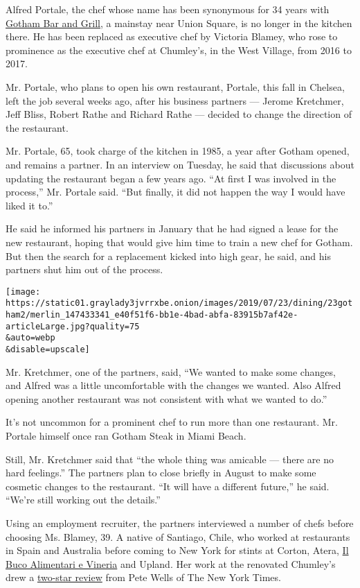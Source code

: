 Alfred Portale, the chef whose name has been synonymous for 34 years
with \href{https://www.gothambarandgrill.com/}{Gotham Bar and Grill}, a
mainstay near Union Square, is no longer in the kitchen there. He has
been replaced as executive chef by Victoria Blamey, who rose to
prominence as the executive chef at Chumley's, in the West Village, from
2016 to 2017.

Mr. Portale, who plans to open his own restaurant, Portale, this fall in
Chelsea, left the job several weeks ago, after his business partners ---
Jerome Kretchmer, Jeff Bliss, Robert Rathe and Richard Rathe --- decided
to change the direction of the restaurant.

Mr. Portale, 65, took charge of the kitchen in 1985, a year after Gotham
opened, and remains a partner. In an interview on Tuesday, he said that
discussions about updating the restaurant began a few years ago. ``At
first I was involved in the process,'' Mr. Portale said. ``But finally,
it did not happen the way I would have liked it to.''

He said he informed his partners in January that he had signed a lease
for the new restaurant, hoping that would give him time to train a new
chef for Gotham. But then the search for a replacement kicked into high
gear, he said, and his partners shut him out of the process.

\texttt{[image: https://static01.graylady3jvrrxbe.onion/images/2019/07/23/dining/23gotham2/merlin\_147433341\_e40f51f6-bb1e-4bad-abfa-83915b7af42e-articleLarge.jpg?quality=75\\\&auto=webp\\\&disable=upscale]}

Mr. Kretchmer, one of the partners, said, ``We wanted to make some
changes, and Alfred was a little uncomfortable with the changes we
wanted. Also Alfred opening another restaurant was not consistent with
what we wanted to do.''

It's not uncommon for a prominent chef to run more than one restaurant.
Mr. Portale himself once ran Gotham Steak in Miami Beach.

Still, Mr. Kretchmer said that ``the whole thing was amicable --- there
are no hard feelings.'' The partners plan to close briefly in August to
make some cosmetic changes to the restaurant. ``It will have a different
future,'' he said. ``We're still working out the details.''

Using an employment recruiter, the partners interviewed a number of
chefs before choosing Ms. Blamey, 39. A native of Santiago, Chile, who
worked at restaurants in Spain and Australia before coming to New York
for stints at Corton, Atera,
\href{https://www.nytimes3xbfgragh.onion/2012/02/15/dining/reviews/il-buco-alimentari-e-vineria-nyc-restaurant-review.html}{Il
Buco Alimentari e Vineria} and Upland. Her work at the renovated
Chumley's drew a
\href{https://www.nytimes3xbfgragh.onion/2017/01/31/dining/chumleys-review-bar-west-village.html}{two-star
review} from Pete Wells of The New York Times.


